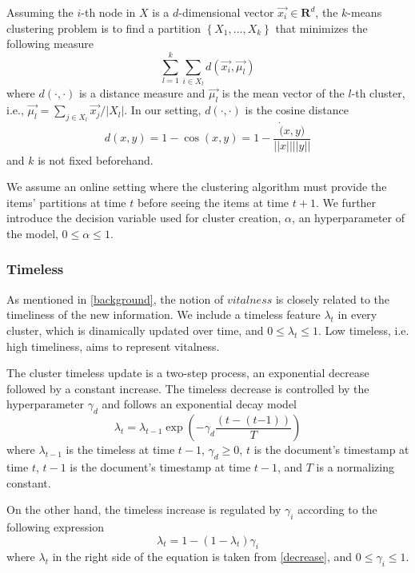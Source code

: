 \documentclass{article}
\begin{document}
Assuming the $i$-th node in $X$ is a $d$-dimensional vector $\vec{x_i} \in \mathbf{R}^d$, the $k$-means clustering problem is to find a partition $\left\{ {X_1, ..., X_k}\right\}$ that minimizes the following measure
\begin{equation}
\sum_{l=1}^{k} \sum_{i \in X_l} d(\vec{x_i},\vec{\mu_l})
\end{equation}
where $d(\cdot,\cdot)$ is a distance measure and $\vec{\mu_l}$ is the mean vector of the $l$-th cluster, i.e., $\vec{\mu_l} = \sum_{j \in X_l}{\vec{x_j}/|X_l|}$.
In our setting, $d(\cdot,\cdot)$ is the cosine distance
\begin{equation}
d(x,y) = 1 - \cos(x,y) = 1 - \frac{\dot(x,y)}{||x||||y||}
\end{equation}
and $k$ is not fixed beforehand.

We assume an online setting where the clustering algorithm must provide the items' partitions at time $t$ before seeing the items at time $t+1$. We further introduce the decision variable used for cluster creation, $\alpha$, an hyperparameter of the model, $0 \leq \alpha \leq 1$.

\subsubsection{Timeless}

As mentioned in \ref{background}, the notion of $vitalness$ is closely related to the timeliness of the new information. We include a timeless feature $\lambda_t$ in every cluster, which is dinamically updated over time, and $0 \leq \lambda_t \leq 1$. Low timeless, i.e. high timeliness, aims to represent vitalness.

The cluster timeless update is a two-step process, an exponential decrease followed by a constant increase.
The timeless decrease is controlled by the hyperparameter $\gamma_d$ and follows an exponential decay model
\begin{equation}
\label{decrease}
\lambda_t = \lambda_{t-1} \exp{(-\gamma_d \frac{(t-(t\mathord{-}1))}{T})}
\end{equation}
where $\lambda_{t-1}$ is the timeless at time $t-1$, $\gamma_d \geq 0$, $t$ is the document's timestamp at time $t$, $t-1$ is the document's timestamp at time $t-1$, and $T$ is a normalizing constant.

On the other hand, the timeless increase is regulated by $\gamma_i$ according to the following expression
\begin{equation}
\lambda_t = 1 - (1 - \lambda_t) \gamma_i
\end{equation}
where $\lambda_t$ in the right side of the equation is taken from \ref{decrease}, and $0 \leq \gamma_i \leq 1$.
\end{document}
